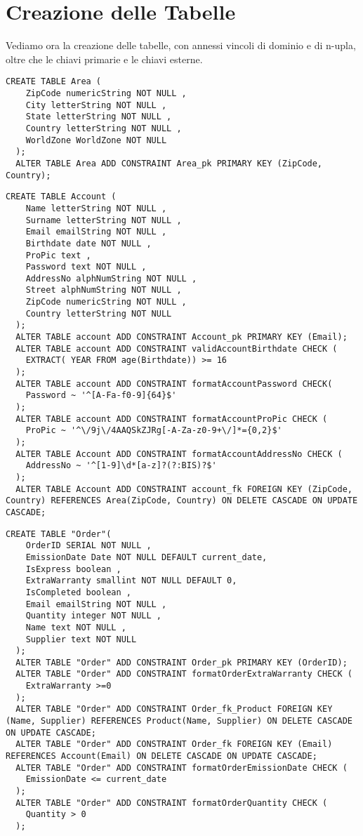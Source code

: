 \section{Creazione delle Tabelle}

Vediamo ora la creazione delle tabelle, con annessi vincoli di dominio e di n-upla, oltre che le chiavi primarie e le chiavi esterne.

\begin{lstlisting}[caption={Creazione della tabella \textbf{Area}}]
  CREATE TABLE Area (
    ZipCode numericString NOT NULL ,
    City letterString NOT NULL ,
    State letterString NOT NULL ,
    Country letterString NOT NULL ,
    WorldZone WorldZone NOT NULL
  );
  ALTER TABLE Area ADD CONSTRAINT Area_pk PRIMARY KEY (ZipCode, Country);
\end{lstlisting}

\begin{lstlisting}[caption={Creazione della tabella \textbf{Account}}]
  CREATE TABLE Account (
    Name letterString NOT NULL ,
    Surname letterString NOT NULL ,
    Email emailString NOT NULL ,
    Birthdate date NOT NULL ,
    ProPic text ,
    Password text NOT NULL ,
    AddressNo alphNumString NOT NULL ,
    Street alphNumString NOT NULL ,
    ZipCode numericString NOT NULL ,
    Country letterString NOT NULL
  );
  ALTER TABLE account ADD CONSTRAINT Account_pk PRIMARY KEY (Email);
  ALTER TABLE account ADD CONSTRAINT validAccountBirthdate CHECK (
    EXTRACT( YEAR FROM age(Birthdate)) >= 16 
  );
  ALTER TABLE account ADD CONSTRAINT formatAccountPassword CHECK(
    Password ~ '^[A-Fa-f0-9]{64}$'
  );
  ALTER TABLE account ADD CONSTRAINT formatAccountProPic CHECK (
    ProPic ~ '^\/9j\/4AAQSkZJRg[-A-Za-z0-9+\/]*={0,2}$'
  );
  ALTER TABLE Account ADD CONSTRAINT formatAccountAddressNo CHECK (
    AddressNo ~ '^[1-9]\d*[a-z]?(?:BIS)?$'
  );
  ALTER TABLE Account ADD CONSTRAINT account_fk FOREIGN KEY (ZipCode, Country) REFERENCES Area(ZipCode, Country) ON DELETE CASCADE ON UPDATE CASCADE;
\end{lstlisting}
  

\newpage
\begin{lstlisting}[caption={Creazione della tabella \textbf{Order}}]
  CREATE TABLE "Order"(
    OrderID SERIAL NOT NULL , 
    EmissionDate Date NOT NULL DEFAULT current_date,
    IsExpress boolean ,
    ExtraWarranty smallint NOT NULL DEFAULT 0,
    IsCompleted boolean ,
    Email emailString NOT NULL ,
    Quantity integer NOT NULL ,
    Name text NOT NULL ,
    Supplier text NOT NULL
  );
  ALTER TABLE "Order" ADD CONSTRAINT Order_pk PRIMARY KEY (OrderID);
  ALTER TABLE "Order" ADD CONSTRAINT formatOrderExtraWarranty CHECK (
    ExtraWarranty >=0
  );
  ALTER TABLE "Order" ADD CONSTRAINT Order_fk_Product FOREIGN KEY (Name, Supplier) REFERENCES Product(Name, Supplier) ON DELETE CASCADE ON UPDATE CASCADE;
  ALTER TABLE "Order" ADD CONSTRAINT Order_fk FOREIGN KEY (Email) REFERENCES Account(Email) ON DELETE CASCADE ON UPDATE CASCADE;
  ALTER TABLE "Order" ADD CONSTRAINT formatOrderEmissionDate CHECK (
    EmissionDate <= current_date
  );
  ALTER TABLE "Order" ADD CONSTRAINT formatOrderQuantity CHECK (
    Quantity > 0
  );
\end{lstlisting}

